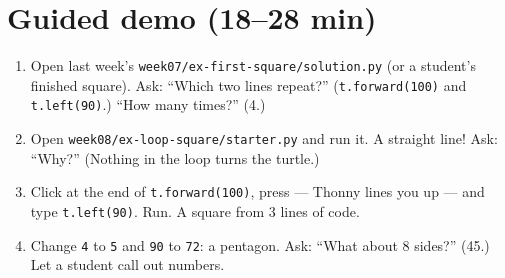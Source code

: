 \section{Guided demo (18--28 min)}
\begin{workedexample}
\begin{enumerate}[leftmargin=1.4em,itemsep=1pt]
  \item Open last week's \texttt{week07/ex-first-square/solution.py} (or a student's finished square). Ask: \enquote{Which two lines repeat?} (\texttt{t.forward(100)} and \texttt{t.left(90)}.) \enquote{How many times?} (4.)
  \item Open \texttt{week08/ex-loop-square/starter.py} and run it. A straight line! Ask: \enquote{Why?} (Nothing in the loop turns the turtle.)
  \item Click at the end of \texttt{t.forward(100)}, press  --- Thonny lines you up --- and type \texttt{t.left(90)}. Run. A square from 3 lines of code.
  \item Change \texttt{4} to \texttt{5} and \texttt{90} to \texttt{72}: a pentagon. Ask: \enquote{What about 8 sides?} (45.) Let a student call out numbers.
\end{enumerate}
\end{workedexample}

